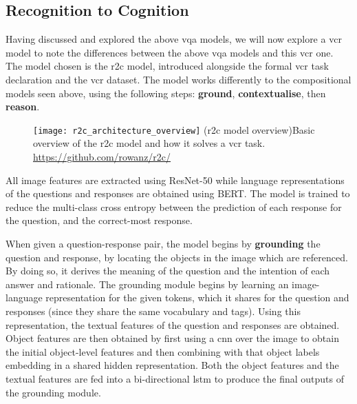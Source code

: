 \clearpage
\subsection{Recognition to Cognition}
\label{subsec:recognition_to_cognition}

Having discussed and explored the above \gls{vqa} models, we will now explore a \gls{vcr} model to note the differences between the above \gls{vqa} models and this \gls{vcr} one.
The model chosen is the \gls{r2c} model\cite{zellers_recognition_2019}, introduced alongside the formal \gls{vcr} task declaration and the \gls{vcr} dataset\cite{zellers_recognition_2019}.
The model works differently to the compositional models seen above, using the following steps: \textbf{ground}, \textbf{contextualise}, then \textbf{reason}.

\begin{figure}[htbp]
    \centering
    \texttt{[image: r2c\_architecture\_overview]}
    \captionsource(\acrshort{r2c} model overview){Basic overview of the \acrshort{r2c} model and how it solves a \acrshort{vcr} task. \label{fig:r2c_architecture_overview}}{\url{https://github.com/rowanz/r2c/}}
\end{figure}

All image features are extracted using ResNet-50\cite{he_deep_2015} while language representations of the questions and responses are obtained using BERT\cite{devlin_bert_2019}.
The model is trained to reduce the multi-class cross entropy between the prediction of each response for the question, and the correct-most response.

When given a question-response pair, the model begins by \textbf{grounding} the question and response, by locating the objects in the image which are referenced.
By doing so, it derives the meaning of the question and the intention of each answer and rationale.
The grounding module begins by learning an image-language representation for the given tokens, which it shares for the question and responses (since they share the same vocabulary and tags).
Using this representation, the textual features of the question and responses are obtained.
Object features are then obtained by first using a \gls{cnn} over the image to obtain the initial object-level features and then combining with that object labels embedding in a shared hidden representation.
Both the object features and the textual features are fed into a bi-directional \gls{lstm} to produce the final outputs of the grounding module.

